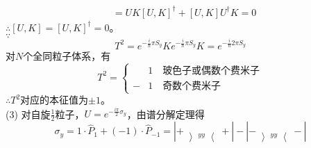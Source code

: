 \documentclass[12pt]{article}
\numberwithin{equation}{section}	 %
\begin{document}
\begin{spacing}{1.5}
\begin{equation}
\begin{aligned}
&= UK\left[U,K\right]^{\dagger} + \left[U,K\right]U^{\dagger}K = 0
\end{aligned}
\end{equation}
$\therefore \left[U,K\right] = \left[U,K\right]^{\dagger} = 0$。\\
$\because$
\begin{equation}
T^{2} = e^{-\frac{i}{\hbar}\pi S_{y}}K e^{-\frac{i}{\hbar}\pi S_{y}}K =e^{-\frac{i}{\hbar}2\pi S_{y}}
\end{equation}
对$N$个全同粒子体系，有
\begin{equation}
T^{2} = \left\{
\begin{aligned}
&1 \quad \text{玻色子或偶数个费米子}\\
-&1  \quad \text{奇数个费米子}
\end{aligned}
\right.	%
\end{equation}
$\therefore T^{2}$对应的本征值为$\pm1$。\\
(3) \quad 对自旋$\displaystyle \frac{1}{2}$粒子，$\displaystyle U=e^{-\frac{i\pi}{2} \sigma_{y}}$，由谱分解定理得\\
\begin{equation}
\sigma_{y} = 1\cdot\hat{P}_{1} + (-1)\cdot\hat{P}_{-1} = \left|+\left>_{yy}\right<+\right| - \left|-\left>_{yy}\right<-\right|
\end{equation}


\end{spacing}
\end{document}
